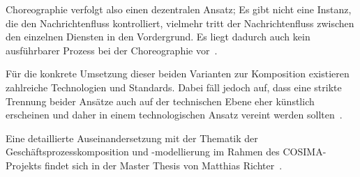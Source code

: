   Choreographie verfolgt also einen dezentralen Ansatz; Es gibt nicht eine Instanz, die den Nachrichtenfluss kontrolliert, vielmehr tritt der Nachrichtenfluss zwischen den einzelnen Diensten in den Vordergrund. Es liegt dadurch auch kein ausführbarer Prozess bei der Choreographie vor~\citep[S. 46]{peltz2003wso}.
  
  Für die konkrete Umsetzung dieser beiden Varianten zur Komposition existieren zahlreiche Technologien und Standards. Dabei fäll jedoch auf, dass eine strikte Trennung beider Ansätze auch auf der technischen Ebene eher künstlich erscheinen und daher in einem technologischen Ansatz vereint werden sollten~\citep[S. 42]{papazoglou2007soc}.
  
  Eine detaillierte Auseinandersetzung mit der Thematik der Geschäftsprozesskomposition und -modellierung im Rahmen des COSIMA-Projekts findet sich in der Master Thesis von Matthias Richter~\citep{samma08}.



% 


  
